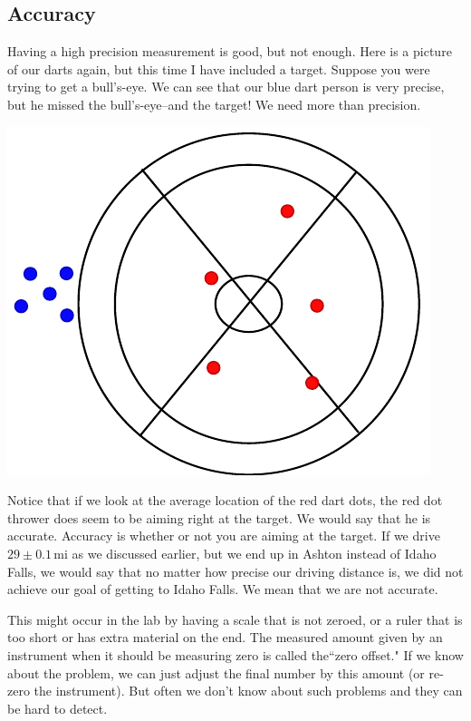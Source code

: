 \documentclass[twoside,11pt,ShortChapTitles]{BYUTextbook}
\begin{document}
\subsection{Accuracy}

Having a high precision measurement is good, but not enough. Here is a picture
of our darts again, but this time I have included a target. Suppose you were
trying to get a bull's-eye. We can see that our blue dart person is very
precise, but he missed the bull's-eye--and the target! We need more than precision.

\begin{center}
\includegraphics{Lab1_Figs/precVaccur_bulls.pdf}\end{center}

 Notice that if we look at the average location of the red dart dots, the red
dot thrower does seem to be aiming right at the target. We would say that he
is accurate. Accuracy is whether or not you are aiming at the target. If we
drive $29\pm0.1\,\text{mi} $ as we discussed earlier, but we end up in Ashton instead of Idaho Falls, we
would say that no matter how precise our driving distance is, we did not
achieve our goal of getting to Idaho Falls. We mean that we are not accurate.

This might occur in the lab by having a scale that is not zeroed, or a ruler
that is too short or has extra material on the end. The measured amount given
by an instrument when it should be measuring zero is called the``zero offset." If we know about the
problem, we can just adjust the final number by this amount (or re-zero the
instrument). But often we don't know about such problems and they can be hard
to detect.
\end{document}

